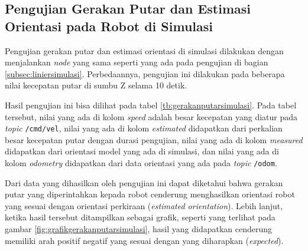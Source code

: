 \subsection{Pengujian Gerakan Putar dan Estimasi Orientasi pada Robot di Simulasi}
\label{subsec:putarsimulasi}

Pengujian gerakan putar dan estimasi orientasi di simulasi dilakukan dengan menjalankan \emph{node} yang sama seperti yang ada pada pengujian di bagian \ref{subsec:liniersimulasi}.
Perbedaannya, pengujian ini dilakukan pada beberapa nilai kecepatan putar di sumbu Z selama 10 detik.

Hasil pengujian ini bisa dilihat pada tabel \ref{tb:gerakanputarsimulasi}.
Pada tabel tersebut, nilai yang ada di kolom \emph{speed} adalah besar kecepatan yang diatur pada \emph{topic} \lstinline{/cmd/vel},
  nilai yang ada di kolom \emph{estimated} didapatkan dari perkalian besar kecepatan putar dengan durasi pengujian,
  nilai yang ada di kolom \emph{measured} didapatkan dari orientasi model yang ada di simulasi,
  dan nilai yang ada di kolom \emph{odometry} didapatkan dari data orientasi yang ada pada \emph{topic} \lstinline{/odom}.



Dari data yang dihasilkan oleh pengujian ini dapat diketahui bahwa gerakan putar yang diperintahkan kepada robot cenderung menghasilkan orientasi robot yang sesuai dengan orientasi perkiraan (\emph{estimated orientation}).
Lebih lanjut, ketika hasil tersebut ditampilkan sebagai grafik,
  seperti yang terlihat pada gambar \ref{fig:grafikgerakanputarsimulasi},
  hasil yang didapatkan cenderung memiliki arah positif negatif yang sesuai dengan yang diharapkan (\emph{expected}).


